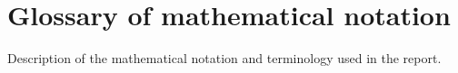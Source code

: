 \section*{Glossary of mathematical notation}

Description of the mathematical notation and terminology used in the report.



 











